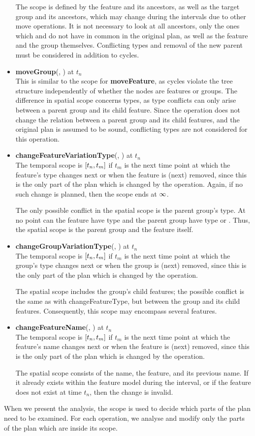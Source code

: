 \begin{itemize}
  The scope is defined by the feature and its ancestors, as well as the target group and its ancestors, which may change during the intervals due to other move operations. It is not necessary to look at all ancestors, only the ones which  and  do not have in common in the original plan, as well as the feature and the group themselves. Conflicting types and removal of the new parent must be considered in addition to cycles.
  \item \textbf{moveGroup}(, ) at $t_n$\\
    This is similar to the scope for \textbf{moveFeature}, as cycles violate the tree structure independently of whether the nodes are features or groups.
    The difference in spatial scope concerns types, as type conflicts can only arise between a parent group and its child feature. Since the operation does not change the relation between a parent group and its child features, and the original plan is assumed to be sound, conflicting types are not considered for this operation.
  \item \textbf{changeFeatureVariationType}(, ) at $t_n$\\
    The temporal scope is $\interval{t_n}{t_m}$ if $t_m$ is the next time point at which the feature's type changes next or when the feature is (next) removed, since this is the only part of the plan which is changed by the operation. Again, if no such change is planned, then the scope ends at $\infty$.
     
    The only possible conflict in the spatial scope is the parent group's type. At no point can the feature have type \mandatory{} and the parent group have type \xortype{} or \ortype{}. Thus, the spatial scope is the parent group and the feature itself.

  \item \textbf{changeGroupVariationType}(, ) at $t_n$\\
    The temporal scope is $\interval{t_n}{t_m}$ if $t_m$ is the next time point at which the group's type changes next or when the group is (next) removed, since this is the only part of the plan which is changed by the operation.

    The spatial scope includes the group's child features; the possible conflict is the same as with changeFeatureType, but between the group and its child features. Consequently, this scope may encompass several features.

  \item \textbf{changeFeatureName}(, ) at $t_n$\\
  The temporal scope is $\interval{t_n}{t_m}$ if $t_m$ is the next time point at which the feature's name changes next or when the feature is (next) removed, since this is the only part of the plan which is changed by the operation.

    The spatial scope consists of the name, the feature, and its previous name. If it already exists within the feature model during the interval, or if the feature does not exist at time $t_n$, then the change is invalid. 
\end{itemize}

When we present the analysis, the scope is used to decide which parts of the plan need to be examined. For each operation, we analyse and modify only the parts of the plan which are inside its scope.

